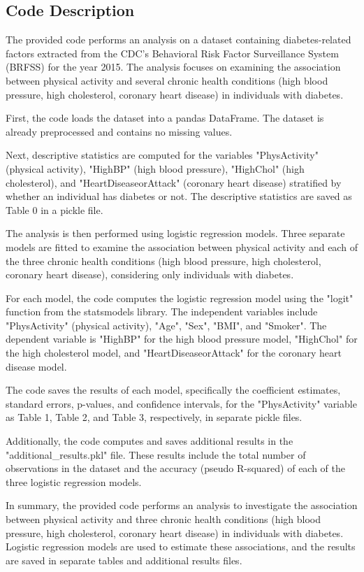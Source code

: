 \documentclass[11pt]{article}
\begin{document}
\subsection{Code Description}

The provided code performs an analysis on a dataset containing diabetes-related factors extracted from the CDC's Behavioral Risk Factor Surveillance System (BRFSS) for the year 2015. The analysis focuses on examining the association between physical activity and several chronic health conditions (high blood pressure, high cholesterol, coronary heart disease) in individuals with diabetes.

First, the code loads the dataset into a pandas DataFrame. The dataset is already preprocessed and contains no missing values.

Next, descriptive statistics are computed for the variables "PhysActivity" (physical activity), "HighBP" (high blood pressure), "HighChol" (high cholesterol), and "HeartDiseaseorAttack" (coronary heart disease) stratified by whether an individual has diabetes or not. The descriptive statistics are saved as Table 0 in a pickle file.

The analysis is then performed using logistic regression models. Three separate models are fitted to examine the association between physical activity and each of the three chronic health conditions (high blood pressure, high cholesterol, coronary heart disease), considering only individuals with diabetes.

For each model, the code computes the logistic regression model using the "logit" function from the statsmodels library. The independent variables include "PhysActivity" (physical activity), "Age", "Sex", "BMI", and "Smoker". The dependent variable is "HighBP" for the high blood pressure model, "HighChol" for the high cholesterol model, and "HeartDiseaseorAttack" for the coronary heart disease model.

The code saves the results of each model, specifically the coefficient estimates, standard errors, p-values, and confidence intervals, for the "PhysActivity" variable as Table 1, Table 2, and Table 3, respectively, in separate pickle files.

Additionally, the code computes and saves additional results in the "additional\_results.pkl" file. These results include the total number of observations in the dataset and the accuracy (pseudo R-squared) of each of the three logistic regression models.

In summary, the provided code performs an analysis to investigate the association between physical activity and three chronic health conditions (high blood pressure, high cholesterol, coronary heart disease) in individuals with diabetes. Logistic regression models are used to estimate these associations, and the results are saved in separate tables and additional results files.
\end{document}
